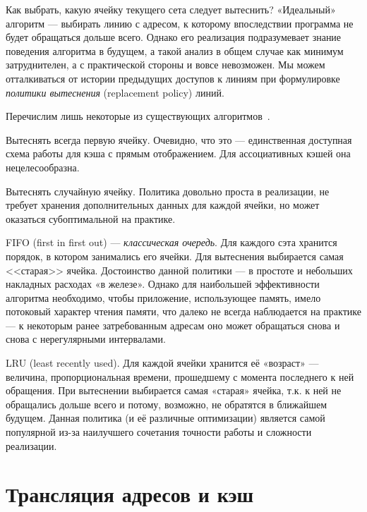 Как выбрать, какую ячейку текущего сета следует вытеснить? «Идеальный» алгоритм --- выбирать линию с адресом, к которому впоследствии программа не будет обращаться дольше всего. Однако  его реализация подразумевает знание поведения алгоритма в будущем, а такой анализ в общем случае как минимум затруднителен, а с практической стороны и вовсе невозможен. Мы можем отталкиваться от истории предыдущих доступов к линиям при формулировке \textit{политики вытеснения} (\abbr replacement policy) линий.

Перечислим лишь некоторые из существующих алгоритмов~\cite{arc}.

\begin{itemize*}
\item    Вытеснять всегда первую ячейку. Очевидно, что это --- единственная доступная схема работы для кэша с прямым отображением. Для ассоциативных кэшей она нецелесообразна.

\item    Вытеснять случайную ячейку. Политика довольно проста в реализации, не требует хранения дополнительных данных для каждой ячейки, но может оказаться субоптимальной на практике.

\item    FIFO (\abbr first in first out) --- \textit{классическая очередь}. Для каждого сэта хранится порядок, в котором занимались его ячейки. Для вытеснения выбирается самая <<старая>> ячейка. Достоинство данной политики --- в простоте и небольших накладных расходах «в железе». Однако для наибольшей эффективности алгоритма необходимо, чтобы приложение, использующее память, имело потоковый характер чтения памяти, что далеко не всегда наблюдается на практике --- к некоторым ранее затребованным адресам оно может обращаться снова и снова с нерегулярными интервалами.

\item    LRU (\abbr least recently used). Для каждой ячейки хранится её «возраст» --- величина, пропорциональная времени, прошедшему с момента последнего к ней обращения. При вытеснении выбирается самая «старая» ячейка, т.к. к ней не обращались дольше всего и потому, возможно, не обратятся в ближайшем будущем. Данная политика (и её различные оптимизации) является самой популярной из-за наилучшего сочетания точности работы и сложности реализации.

\end{itemize*}

\section{Трансляция адресов и кэш}


